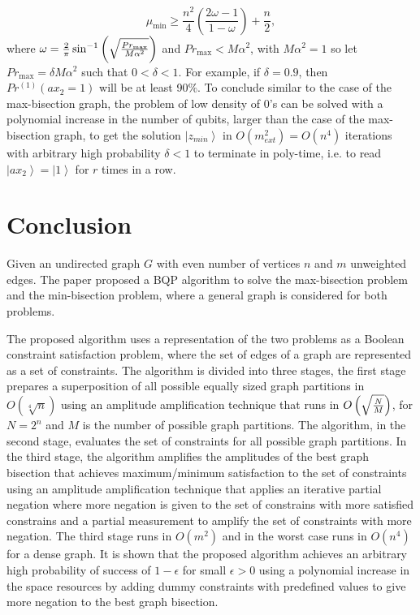 \documentclass[a4paper]{article}
\begin{document}
\begin{equation}
\mu _{\min }  \ge \frac{{n^2 }}{4}\left( {\frac{{2\omega  - 1}}{{1 - \omega }}} \right) + \frac{n}{2},
\end{equation}
\noindent
where $\omega  = {\textstyle{2 \over \pi }}\sin ^{ - 1} \left( {\sqrt {{{{Pr_{\max } } \over {M\alpha ^2 }}}} } \right)$ 
and $Pr_{\max }  < {\textstyle{{M \alpha ^2 }}}$, with $M\alpha^2=1$ so let 
$Pr_{\max }  = \delta {\textstyle{{M \alpha ^2 } }}$ such that $0<\delta<1$. For example, if $\delta=0.9$, 
then $Pr ^{(1)} \left( {ax_2  = 1} \right)$ will be at least 90$\%$. 
To conclude similar to the case of the max-bisection graph, the problem of low density of 0's can be solved with a polynomial 
increase in the number of qubits, larger than the case of the max-bisection graph, to get the solution $\left|z_{min} \right\rangle$ 
in $O\left(m_{ext}^2\right)=O\left( {n^4 } \right)$ iterations with arbitrary high probability $\delta<1$ 
to terminate in poly-time, i.e. to read $\left|ax_2 \right\rangle=\left|1 \right\rangle$ 
for $r$ times in a row.












\section{Conclusion}

Given an undirected graph $G$ with even number of vertices $n$ and $m$ unweighted edges. 
The paper proposed a BQP algorithm to solve the max-bisection problem and the min-bisection problem, where a general graph 
is considered for both problems.
 
The proposed algorithm uses a representation of the two problems as a Boolean constraint satisfaction problem,  
where the set of edges of a graph are represented as a set of constraints. The algorithm is divided into three 
stages, the first stage prepares a superposition of all possible equally sized graph partitions in $O\left( {\sqrt[4]{n}} \right)$ 
using an amplitude amplification technique that runs in $O\left( {\sqrt {{\textstyle{N \over M}}} } \right)$, 
for $N=2^n$ and $M$ is the number of possible graph partitions. The algorithm, in the second stage, 
evaluates the set of constraints for all possible graph partitions. In the third stage, the algorithm amplifies 
the amplitudes of the best graph bisection that achieves maximum/minimum satisfaction to the set of constraints 
using an amplitude amplification technique that applies an iterative partial negation 
where more negation is given to the set of constrains with more satisfied constrains and a partial measurement to amplify 
the set of constraints with more negation. 
The third stage runs in $O(m^2)$ and in the worst case runs in $O(n^4)$ for a dense graph. 
It is shown that the proposed algorithm achieves an arbitrary high probability of success of 
$1-\epsilon$ for small $\epsilon>0$ using a polynomial increase in the space resources by adding dummy constraints with predefined 
values to give more negation to the best graph bisection. 
\end{document}

